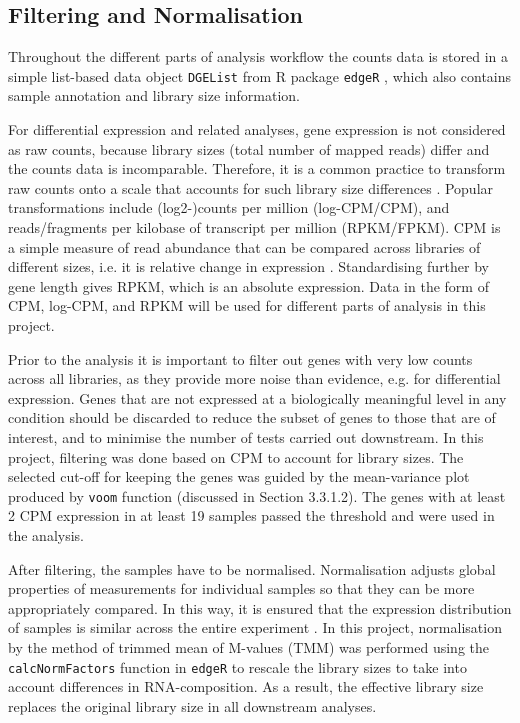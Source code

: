     \subsection{Filtering and Normalisation}
    
   Throughout the different parts of analysis workflow the counts data is stored in a simple list-based data object \texttt{DGEList} from R package \texttt{edgeR} \cite{Robinson2010EdgeR:Data}, which also contains sample annotation and library size information. 

    For differential expression and related analyses, gene expression is not considered as raw counts, because library sizes (total number of mapped reads) differ and the counts data is incomparable. Therefore, it is a common practice to transform raw counts onto a scale that accounts for such library size differences \cite{law2016rna}. Popular transformations include (log2-)counts per million (log-CPM/CPM), and reads/fragments per kilobase of transcript per million (RPKM/FPKM). CPM is a simple measure of read abundance that can be compared across libraries of different sizes, i.e. it is relative change in expression \cite{Law2014}. Standardising further by gene length gives RPKM, which is an absolute expression. Data in the form of CPM, log-CPM, and RPKM will be used for different parts of analysis in this project. 
    
    Prior to the analysis it is important to filter out genes with very low counts across all libraries, as they provide more noise than evidence, e.g. for differential expression. Genes that are not expressed at a biologically meaningful level in any condition should be discarded to reduce the subset of genes to those that are of interest, and to minimise the number of tests carried out downstream. In this project, filtering was done based on CPM to account for library sizes. The selected cut-off for keeping the genes was guided by the mean-variance plot produced by \texttt{voom} function (discussed in Section 3.3.1.2). The genes with at least 2 CPM expression in at least 19 samples passed the threshold and were used in the analysis.
    
    After filtering, the samples have to be normalised. Normalisation adjusts global properties of measurements for individual samples so that they can be more appropriately compared. In this way, it is ensured that the expression distribution of samples is similar across the entire experiment \cite{Robinson2010}. In this project, normalisation by the method of trimmed mean of M-values (TMM) \cite{RobinsonAData} was performed using the \texttt{calcNormFactors} function in \texttt{edgeR} to rescale the library sizes to take into account differences in RNA-composition. As a result, the effective library size replaces the original library size in all downstream analyses. 
    
